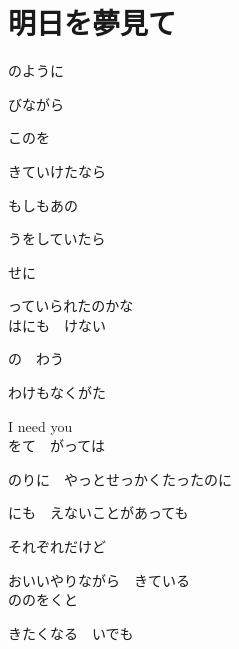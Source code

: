 \section{ 明日を夢見て}


\large{

のように　

びながら

このを　

きていけたなら

もしもあの　

うをしていたら

せに

っていられたのかな
\\

はにも　けない

の　わう

わけもなくがた

I need you
\\

をて　がっては

のりに　やっとせっかくたったのに

にも　えないことがあっても

それぞれだけど

おいいやりながら　きている
\\

ののをくと

きたくなる　いでも

}
